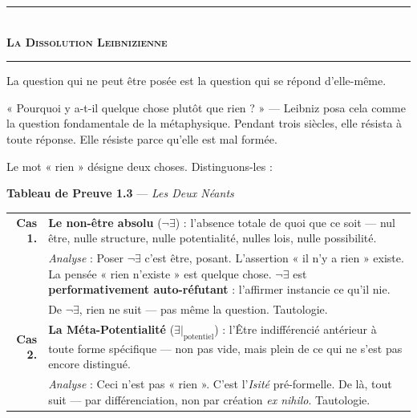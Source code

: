\documentclass[10pt, openany, oneside]{book}
\renewcommand{\normalsize}{\fontsize{10}{13}\selectfont}
\begin{document}
\begin{center}
    \rule{0.3\textwidth}{0.4pt}\\[0.5em]
    {\normalsize\bfseries\scshape La Dissolution Leibnizienne}\\[0.3em]
    \rule{0.3\textwidth}{0.4pt}
\end{center}

\vspace{1em}

\noindent La question qui ne peut être posée est la question qui se répond d'elle-même.

« Pourquoi y a-t-il quelque chose plutôt que rien ? » --- Leibniz posa cela comme la question fondamentale de la métaphysique. Pendant trois siècles, elle résista à toute réponse. Elle résiste parce qu'elle est mal formée.

Le mot « rien » désigne deux choses. Distinguons-les :

\vspace{0.5em}

\textbf{Tableau de Preuve 1.3} --- \textit{Les Deux Néants}

\vspace{0.5em}

\noindent\begin{tabular}{r p{}}
\textbf{Cas 1.} & \textbf{Le non-être absolu} ($\neg\exists$) : l'absence totale de quoi que ce soit --- nul être, nulle structure, nulle potentialité, nulles lois, nulle possibilité. \\[0.3em]
 & \textit{Analyse} : Poser $\neg\exists$ c'est être, posant. L'assertion « il n'y a rien » existe. La pensée « rien n'existe » est quelque chose. $\neg\exists$ est \textbf{performativement auto-réfutant} : l'affirmer instancie ce qu'il nie. \\[0.3em]
 & De $\neg\exists$, rien ne suit --- pas même la question. Tautologie. \\[0.5em]
\textbf{Cas 2.} & \textbf{La Méta-Potentialité} ($\exists|_{\text{potentiel}}$) : l'Être indifférencié antérieur à toute forme spécifique --- non pas vide, mais plein de ce qui ne s'est pas encore distingué. \\[0.3em]
 & \textit{Analyse} : Ceci n'est pas « rien ». C'est l'\textit{Isité} pré-formelle. De là, tout suit --- par différenciation, non par création \textit{ex nihilo}. Tautologie. \\[0.3em]
\end{tabular}

\vspace{0.8em}
\end{document}

